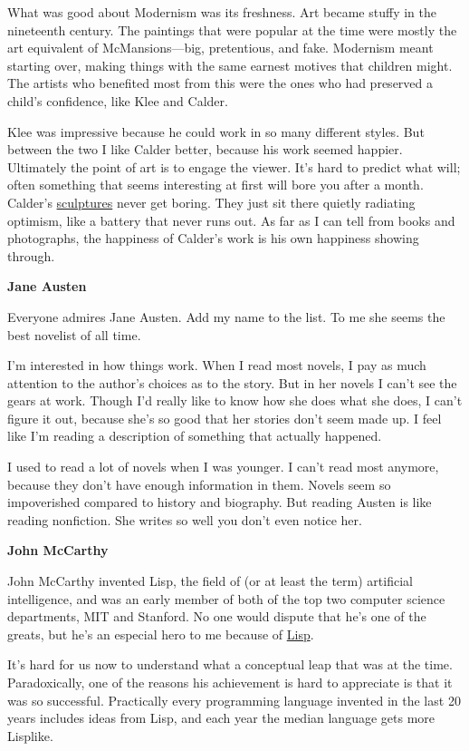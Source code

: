 What was good about Modernism was its freshness. Art became stuffy in
the nineteenth century. The paintings that were popular at the time were
mostly the art equivalent of McMansions---big, pretentious, and fake.
Modernism meant starting over, making things with the same earnest
motives that children might. The artists who benefited most from this
were the ones who had preserved a child's confidence, like Klee and
Calder.

Klee was impressive because he could work in so many different styles.
But between the two I like Calder better, because his work seemed
happier. Ultimately the point of art is to engage the viewer. It's hard
to predict what will; often something that seems interesting at first
will bore you after a month. Calder's
\href{https://www.flickr.com/photos/uergevich/7029234689/}{sculptures}
never get boring. They just sit there quietly radiating optimism, like a
battery that never runs out. As far as I can tell from books and
photographs, the happiness of Calder's work is his own happiness showing
through.

\textbf{Jane Austen}

Everyone admires Jane Austen. Add my name to the list. To me she seems
the best novelist of all time.

I'm interested in how things work. When I read most novels, I pay as
much attention to the author's choices as to the story. But in her
novels I can't see the gears at work. Though I'd really like to know how
she does what she does, I can't figure it out, because she's so good
that her stories don't seem made up. I feel like I'm reading a
description of something that actually happened.

I used to read a lot of novels when I was younger. I can't read most
anymore, because they don't have enough information in them. Novels seem
so impoverished compared to history and biography. But reading Austen is
like reading nonfiction. She writes so well you don't even notice her.

\textbf{John McCarthy}

John McCarthy invented Lisp, the field of (or at least the term)
artificial intelligence, and was an early member of both of the top two
computer science departments, MIT and Stanford. No one would dispute
that he's one of the greats, but he's an especial hero to me because of
\href{rootsoflisp.html}{Lisp}.

It's hard for us now to understand what a conceptual leap that was at
the time. Paradoxically, one of the reasons his achievement is hard to
appreciate is that it was so successful. Practically every programming
language invented in the last 20 years includes ideas from Lisp, and
each year the median language gets more Lisplike.

